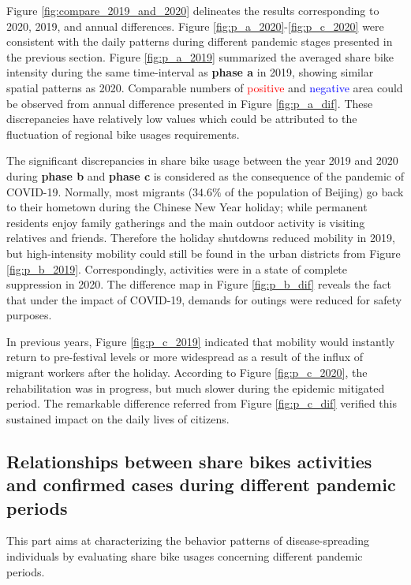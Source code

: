 \documentclass[ijgi,submit,moreauthors,pdftex]{Definitions/mdpi}
\begin{document}
Figure \ref{fig:compare_2019_and_2020} delineates the results corresponding to 2020, 2019, and annual differences.
Figure \ref{fig:p_a_2020}-\ref{fig:p_c_2020} were consistent with the daily patterns during different pandemic stages presented in the previous section.
Figure \ref{fig:p_a_2019} summarized the averaged share bike intensity during the same time-interval as \textbf{phase a} in 2019, showing similar spatial patterns as 2020. 
Comparable numbers of \textcolor{red}{positive} and \textcolor{blue}{negative} area could be observed from annual difference presented in Figure \ref{fig:p_a_dif}. These discrepancies have relatively low values which could be attributed to the fluctuation of regional bike usages requirements.  

The significant discrepancies in share bike usage between the year 2019 and 2020 during \textbf{phase b} and \textbf{phase c} is considered as the consequence of the pandemic of COVID-19. 
Normally, most migrants ($34.6\%$ of the population of Beijing) go back to their hometown during the Chinese New Year holiday; while permanent residents enjoy family gatherings and the main outdoor activity is visiting relatives and friends.
Therefore the holiday shutdowns reduced mobility in 2019, but high-intensity mobility could still be found in the urban districts from Figure \ref{fig:p_b_2019}. 
Correspondingly, activities were in a state of complete suppression in 2020. 
The difference map in Figure \ref{fig:p_b_dif} reveals the fact that under the impact of COVID-19, demands for outings were reduced for safety purposes.

In previous years, Figure \ref{fig:p_c_2019} indicated that mobility would instantly return to pre-festival levels or more widespread as a result of the influx of migrant workers after the holiday.
According to Figure \ref{fig:p_c_2020}, the rehabilitation was in progress, but much slower during the epidemic mitigated period.
The remarkable difference referred from Figure \ref{fig:p_c_dif} verified this sustained impact on the daily lives of citizens.

\subsection{Relationships between share bikes activities and confirmed cases during different pandemic periods} \label{sec:activities_confirmed_cases}

This part aims at characterizing the behavior patterns of disease-spreading individuals by evaluating share bike usages concerning different pandemic periods.%
\end{document}
